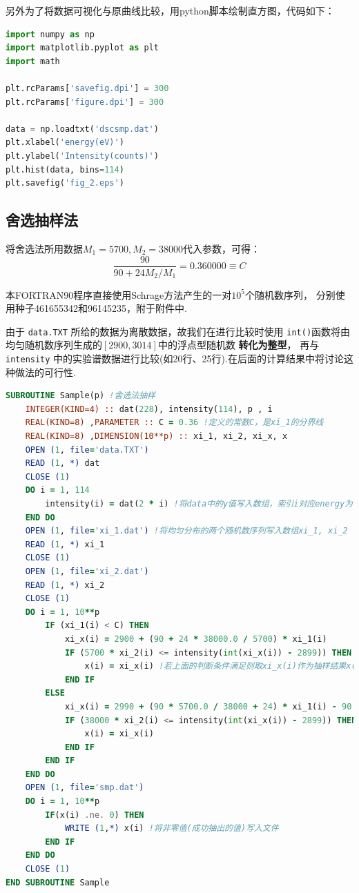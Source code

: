 \documentclass[12pt,a4paper,utf8]{ctexart}
\begin{document}
另外为了将数据可视化与原曲线比较，用python脚本绘制直方图，代码如下：

\begin{framed}
\begin{lstlisting}[language=python]
import numpy as np
import matplotlib.pyplot as plt
import math

plt.rcParams['savefig.dpi'] = 300
plt.rcParams['figure.dpi'] = 300

data = np.loadtxt('dscsmp.dat')
plt.xlabel('energy(eV)')
plt.ylabel('Intensity(counts)')
plt.hist(data, bins=114)
plt.savefig('fig_2.eps')
\end{lstlisting}
\end{framed}

\subsection{舍选抽样法}
    将舍选法所用数据$M_1 = 5700,M_2 = 38000$代入参数，可得：
    \begin{equation}
        \frac{90}{90 + 24M_2/M_1} = 0.360000 \equiv C
    \end{equation}
    
    本FORTRAN90程序直接使用Schrage方法产生的一对$10^5$个随机数序列，
    分别使用种子461655342和96145235，附于附件中.

    由于 \texttt{data.TXT}
    所给的数据为离散数据，故我们在进行比较时使用
    \texttt{int()}函数将由均匀随机数序列生成的$[2900,3014]$中的浮点型随机数
    \textbf{转化为整型}，
    再与 \texttt{intensity}
    中的实验谱数据进行比较(如20行、25行).在后面的计算结果中将讨论这种做法的可行性.

\begin{framed}
\begin{lstlisting}[language=Fortran]
SUBROUTINE Sample(p) !舍选法抽样
    INTEGER(KIND=4) :: dat(228), intensity(114), p , i
    REAL(KIND=8) ,PARAMETER :: C = 0.36 !定义的常数C，是xi_1的分界线
    REAL(KIND=8) ,DIMENSION(10**p) :: xi_1, xi_2, xi_x, x
    OPEN (1, file='data.TXT')
    READ (1, *) dat
    CLOSE (1)
    DO i = 1, 114
        intensity(i) = dat(2 * i) !将data中的y值写入数组，索引i对应energy为(2899+i)eV
    END DO
    OPEN (1, file='xi_1.dat') !将均匀分布的两个随机数序列写入数组xi_1, xi_2
    READ (1, *) xi_1
    CLOSE (1)
    OPEN (1, file='xi_2.dat')
    READ (1, *) xi_2
    CLOSE (1)
    DO i = 1, 10**p
        IF (xi_1(i) < C) THEN
            xi_x(i) = 2900 + (90 + 24 * 38000.0 / 5700) * xi_1(i)
            IF (5700 * xi_2(i) <= intensity(int(xi_x(i)) - 2899)) THEN
                x(i) = xi_x(i) !若上面的判断条件满足则取xi_x(i)作为抽样结果x(i)
            END IF
        ELSE
            xi_x(i) = 2990 + (90 * 5700.0 / 38000 + 24) * xi_1(i) - 90 * 5700.0 / 38000
            IF (38000 * xi_2(i) <= intensity(int(xi_x(i)) - 2899)) THEN
                x(i) = xi_x(i)
            END IF
        END IF
    END DO
    OPEN (1, file='smp.dat')
    DO i = 1, 10**p
        IF(x(i) .ne. 0) THEN
            WRITE (1,*) x(i) !将非零值(成功抽出的值)写入文件
        END IF
    END DO
    CLOSE (1)
END SUBROUTINE Sample       
\end{lstlisting}
\end{framed}
\end{document}
